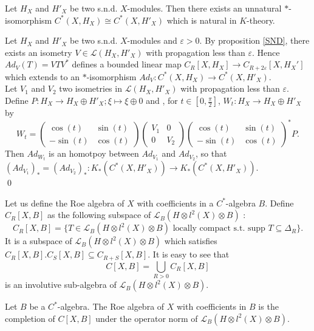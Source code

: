 \begin{prop}
Let $H_X$ and $H'_X$ be two s.n.d. $X$-modules. Then there exists an unnatural $*$-isomorphism $C^*(X,H_X)\cong C^*(X,H'_X)$ which is natural in $K$-theory.
\end{prop}
\begin{dem}
Let $H_X$ and $H'_X$ be two s.n.d. $X$-modules and $\varepsilon>0$. By proposition \ref{SND}, there exists an isometry $V\in\mathcal L(H_X,H'_X)$ with propagation less than $\varepsilon$. Hence $Ad_V(T) = V T V^*$ defines a bounded linear map $C_R[X,H_X]\rightarrow C_{R+2\varepsilon}[X,H_X']$ which extends to an $*$-isomorphism $Ad_V : C^*(X,H_X)\rightarrow C^*(X,H'_X)$.\\

Let $V_1$ and $V_2$ two isometries in $\mathcal L(H_X,H'_X)$ with propagation less than $\varepsilon$. Define $P : H_X\rightarrow H_X\oplus H'_X ; \xi \mapsto \xi \oplus 0$ and , for $t\in [0,\frac{\pi}{2}]$, $W_t : H_X \rightarrow H_X\oplus H'_X$ by 
\[W_t = 
\begin{pmatrix} \cos(t) & \sin (t)\\ -\sin (t) & \cos (t)\end{pmatrix}
\begin{pmatrix} V_1 & 0 \\ 0 & V_2 \end{pmatrix}
\begin{pmatrix} \cos(t) & \sin (t)\\ -\sin (t) & \cos (t)\end{pmatrix}^* P.\] 
Then $Ad_{W_t}$ is an homotpoy between $Ad_{V_1}$ and $Ad_{V_2}$, so that $(Ad_{V_1})_* = (Ad_{V_2})_* : K_*(C^*(X,H'_X))\rightarrow K_*(C^*(X,H'_X))$.\\
\qed
\end{dem}

Let us define the Roe algebra of $X$ with coefficients in a $C^*$-algebra $B$. Define $C_R[X,B]$ as the following subspace of $\mathcal L_B(H\otimes l^2(X)\otimes B)$ :
\[C_R[X,B] = \{T\in \mathcal L_B(H\otimes l^2(X)\otimes B) \text{ locally compact  s.t. supp }T\subseteq \Delta_R \}.\]
It is a subspace of $\mathcal L_B(H\otimes l^2(X)\otimes B)$ which satisfies $C_R[X,B].C_S[X,B]\subseteq C_{R+S}[X,B]$. It is easy to see that 
\[C[X,B] = \bigcup_{R>0} C_R[X,B]\] 
is an involutive sub-algebra of $\mathcal L_B(H\otimes l^2(X)\otimes B)$.

\begin{definition}
Let $B$ be a $C^*$-algebra. The Roe algebra of $X$ with coefficients in $B$ is the completion of $C[X,B]$ under the operator norm of $\mathcal L_B(H\otimes l^2(X)\otimes B)$. 
\end{definition} 

